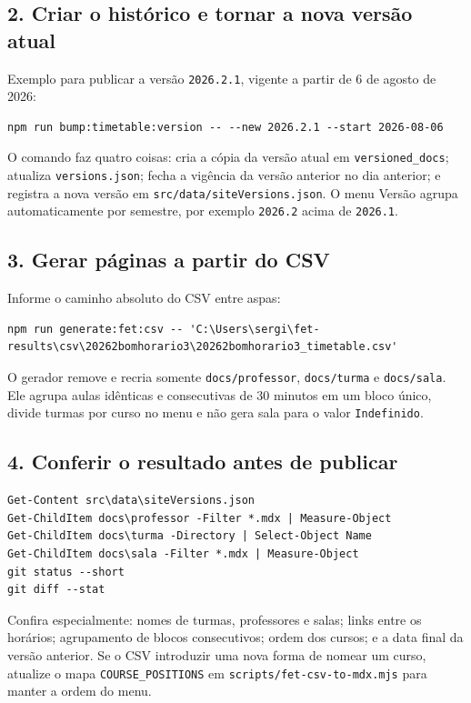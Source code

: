 \documentclass[11pt,a4paper]{article}
\begin{document}
\subsection{2. Criar o histórico e tornar a nova versão atual}
Exemplo para publicar a versão \texttt{2026.2.1}, vigente a partir de 6 de agosto de 2026:
\begin{lstlisting}
npm run bump:timetable:version -- --new 2026.2.1 --start 2026-08-06
\end{lstlisting}
O comando faz quatro coisas: cria a cópia da versão atual em \texttt{versioned\_docs}; atualiza \texttt{versions.json}; fecha a vigência da versão anterior no dia anterior; e registra a nova versão em \texttt{src/data/siteVersions.json}. O menu Versão agrupa automaticamente por semestre, por exemplo \texttt{2026.2} acima de \texttt{2026.1}.

\subsection{3. Gerar páginas a partir do CSV}
Informe o caminho absoluto do CSV entre aspas:
\begin{lstlisting}
npm run generate:fet:csv -- 'C:\Users\sergi\fet-results\csv\20262bomhorario3\20262bomhorario3_timetable.csv'
\end{lstlisting}
O gerador remove e recria somente \texttt{docs/professor}, \texttt{docs/turma} e \texttt{docs/sala}. Ele agrupa aulas idênticas e consecutivas de 30 minutos em um bloco único, divide turmas por curso no menu e não gera sala para o valor \texttt{Indefinido}.

\subsection{4. Conferir o resultado antes de publicar}
\begin{lstlisting}
Get-Content src\data\siteVersions.json
Get-ChildItem docs\professor -Filter *.mdx | Measure-Object
Get-ChildItem docs\turma -Directory | Select-Object Name
Get-ChildItem docs\sala -Filter *.mdx | Measure-Object
git status --short
git diff --stat
\end{lstlisting}
Confira especialmente: nomes de turmas, professores e salas; links entre os horários; agrupamento de blocos consecutivos; ordem dos cursos; e a data final da versão anterior. Se o CSV introduzir uma nova forma de nomear um curso, atualize o mapa \texttt{COURSE\_POSITIONS} em \texttt{scripts/fet-csv-to-mdx.mjs} para manter a ordem do menu.
\end{document}
